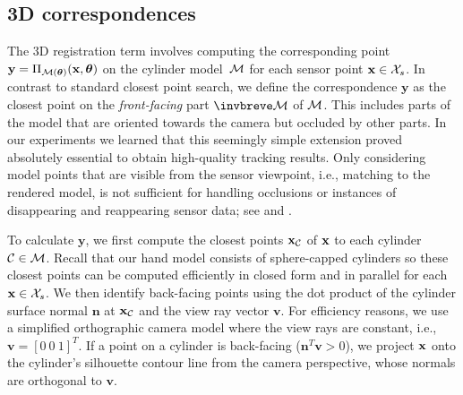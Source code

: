 



\subsection*{3D correspondences}
The 3D registration term involves computing the corresponding point  $\mathbf{y} = \Pi_{\mathcal{M}(\boldsymbol{\theta})}(\mathbf{x},\boldsymbol{\theta})$ on the cylinder model~$\mathcal{M}$ for each sensor point $\mathbf{x} \in \mathcal{X}_{s}$. 
In contrast to standard closest point search, we define the correspondence $\mathbf{y}$  as the closest point on the \emph{front-facing} part $\visiblehand$ of $\mathcal{M}$. This includes parts of the model that are oriented towards the camera but occluded by other parts. 
 In our experiments we learned that this seemingly simple extension proved absolutely essential to obtain high-quality tracking results.
 Only considering model points that are visible from the sensor viewpoint, i.e., matching to the rendered model, is not sufficient for handling occlusions or instances of disappearing and reappearing sensor data; see  and . 
 
To calculate $\mathbf{y}$, we first compute the closest points $\mathbf{x}_\mathcal{C}$ of $\mathbf{x}$ to each cylinder $\mathcal{C}\in\mathcal{M}$. Recall that our hand model consists of sphere-capped cylinders so these closest points can be computed efficiently in closed form and in parallel for each $\mathbf{x} \in \mathcal{X}_{s}$.
We then identify back-facing points using the dot product of the cylinder surface normal $\mathbf{n}$ at $\mathbf{x}_\mathcal{C}$ and the view ray vector $\mathbf{v}$. 
%
For efficiency reasons, we use a simplified orthographic camera model where the view rays are constant, i.e., $\mathbf{v} = [0~0~1]^T$. If a point on a cylinder is back-facing ($\mathbf{n}^T\mathbf{v}>0$), we project $\mathbf{x}$ onto the cylinder's silhouette contour line from the camera perspective, whose normals are orthogonal to $\mathbf{v}$.

